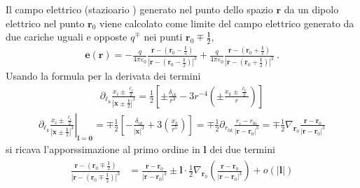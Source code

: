 \documentclass[letterpaper,10pt,italian]{jupyterBook}
\begin{document}
\sphinxAtStartPar
Il campo elettrico (stazioario  ) generato nel punto dello spazio \(\mathbf{r}\) da un dipolo elettrico nel punto \(\mathbf{r}_0\) viene calcolato come limite del campo elettrico generato da due cariche uguali e opposte \(q^{\mp}\) nei punti \(\mathbf{r}_0 \mp \frac{\mathbf{l}}{2}\),
\begin{equation*}
\begin{split}\mathbf{e}(\mathbf{r}) = -\frac{q}{4 \pi \varepsilon_0} \frac{\mathbf{r} - \left( \mathbf{r}_0 - \frac{\mathbf{l}}{2} \right)}{\left|\mathbf{r} - \left( \mathbf{r}_0 - \frac{\mathbf{l}}{2} \right)\right|^3} + \frac{q}{4 \pi \varepsilon_0} \frac{\mathbf{r} - \left( \mathbf{r}_0 + \frac{\mathbf{l}}{2} \right)}{\left|\mathbf{r} - \left( \mathbf{r}_0 + \frac{\mathbf{l}}{2} \right)\right|^3} \ .\end{split}
\end{equation*}
\sphinxAtStartPar
Usando la formula per la derivata dei termini
\begin{equation*}
\begin{split}\partial_{\ell_k} \frac{x_i \pm \frac{\ell_i}{2}}{\left|\mathbf{x} \pm \frac{\mathbf{l}}{2} \right|^3} = \frac{1}{2} \left[ \pm \frac{\delta_{ik}}{r^3} - 3 r^{-4} \left( \pm \frac{x_k \pm \frac{\ell_k}{2}}{r} \right) \right]\end{split}
\end{equation*}\begin{equation*}
\begin{split}\left. \partial_{\ell_k} \frac{x_i \pm \frac{\ell_i}{2}}{\left|\mathbf{x} \pm \frac{\mathbf{l}}{2} \right|^3} \right|_{\mathbf{l} = \mathbf{0}} = \mp \frac{1}{2} \left[ - \frac{\delta_{ik}}{|\mathbf{x}|^3} + 3 \left( \frac{x_k}{r^5} \right) \right] = \mp \frac{1}{2} \partial_{r_{0 k}} \frac{r_i - r_{0 i}}{|\mathbf{r} - \mathbf{r}_0|^3} = \mp \frac{1}{2} \nabla_{\mathbf{r}_0} \frac{\mathbf{r} - \mathbf{r}_0}{|\mathbf{r} - \mathbf{r}_0|^3} \end{split}
\end{equation*}
\sphinxAtStartPar
si ricava l’apporssimazione al primo ordine in \(\mathbf{l}\) dei due termini
\begin{equation*}
\begin{split}\begin{aligned}
  \frac{\mathbf{r} - \left( \mathbf{r}_0 \mp \frac{\mathbf{l}}{2} \right)}{\left|\mathbf{r} - \left( \mathbf{r}_0 \mp \frac{\mathbf{l}}{2} \right)\right|^3} 
  & = \frac{\mathbf{r} - \mathbf{r}_0 }{\left|\mathbf{r} - \mathbf{r}_0 \right|^3} \pm \mathbf{l} \cdot \frac{1}{2} \nabla_{\mathbf{r}_0} \left( \frac{\mathbf{r} - \mathbf{r}_0}{|\mathbf{r} - \mathbf{r}_0|^3} \right) + o(|\mathbf{l}|)\\
\end{aligned}\end{split}
\end{equation*}
\end{document}
